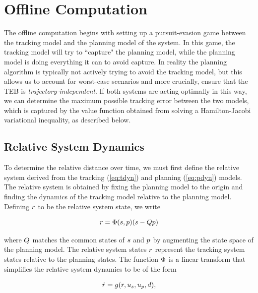 \section{Offline Computation \label{sec:precomp}}
The offline computation begins with setting up a pursuit-evasion game \cite{Tomlin00,Mitchell05} between the tracking model and the planning model of the system. 
In this game, the tracking model will try to ``capture" the planning model, while the planning model is doing everything it can to avoid capture. 
In reality the planning algorithm is typically not actively trying to avoid the tracking model, but this allows us to account for worst-case scenarios and more crucially, ensure that the TEB is \textit{trajectory-independent}. 
If both systems are acting optimally in this way, we can determine the %
maximum possible tracking error between the two models, which is captured by the value function obtained from solving a Hamilton-Jacobi variational inequality, as described below.

\subsection{Relative System Dynamics}
To determine the relative distance over time, we must first define the relative system derived from the tracking (\ref{eq:tdyn}) and planning (\ref{eq:pdyn}) models. 
The relative system is obtained by fixing the planning model to the origin and finding the dynamics of the tracking model relative to the planning model.
Defining $r$ to be the relative system state, we write

\begin{equation}
\label{eq:rstate}
\rstate = \rtrans(\tstate,\pstate)(\tstate - \ptmat\pstate)
\end{equation}

\noindent where $Q$ matches the common states of $s$ and $p$ by augmenting the state space of the planning model.
The relative system states $r$ represent the tracking system states relative to the planning states.
The function $\Phi$ is a linear transform that simplifies the relative system dynamics to be of the form

\begin{equation}
\label{eq:rdyn}
\dot\rstate = \rdyn(\rstate, \tctrl, \pctrl, \dstb),
\end{equation}

